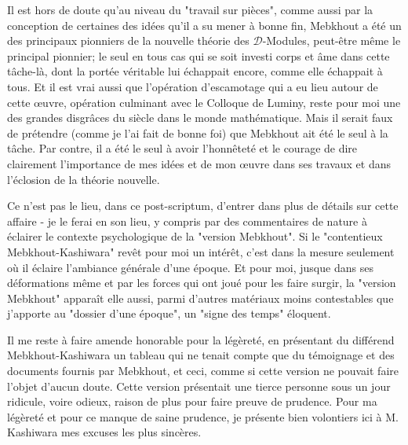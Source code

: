 Il est hors de doute qu'au niveau du "travail sur pièces", comme aussi par la conception de certaines des idées qu'il a su mener à bonne fin, Mebkhout a été un des principaux pionniers de la nouvelle théorie des $\mathscr{D}$-Modules, peut-être même le principal pionnier; le seul en tous cas qui se soit investi corps et âme dans cette tâche-là, dont la portée véritable lui échappait encore, comme elle échappait à tous. Et il est vrai aussi que l'opération d'escamotage qui a eu lieu autour de cette œuvre, opération culminant avec le Colloque de Luminy, reste pour moi une des grandes disgrâces du siècle dans le monde mathématique. Mais il serait faux de prétendre (comme je l'ai fait de bonne foi) que Mebkhout ait été le seul à la tâche. Par contre, il a été le seul à avoir l'honnêteté et le courage de dire clairement l'importance de mes idées et de mon œuvre dans ses travaux et dans l'éclosion de la théorie nouvelle.

Ce n'est pas le lieu, dans ce post-scriptum, d'entrer dans plus de détails sur cette affaire - je le ferai en son lieu, y compris par des commentaires de nature à éclairer le contexte psychologique de la "version Mebkhout". Si le "contentieux Mebkhout-Kashiwara" revêt pour moi un intérêt, c'est dans la mesure seulement où il éclaire l'ambiance générale d'une époque. Et pour moi, jusque dans ses déformations même et par les forces qui ont joué pour les faire surgir, la "version Mebkhout" apparaît elle aussi, parmi d'autres matériaux moins contestables que j'apporte au "dossier d'une époque", un "signe des temps" éloquent.

Il me reste à faire amende honorable pour la légèreté, en présentant du différend Mebkhout-Kashiwara un tableau qui ne tenait compte que du témoignage et des documents fournis par Mebkhout, et ceci, comme si cette version ne pouvait faire l'objet d'aucun doute. Cette version présentait une tierce personne sous un jour ridicule, voire odieux, raison de plus pour faire preuve de prudence. Pour ma légèreté et pour ce manque de saine prudence, je présente bien volontiers ici à M. Kashiwara mes excuses les plus sincères.







